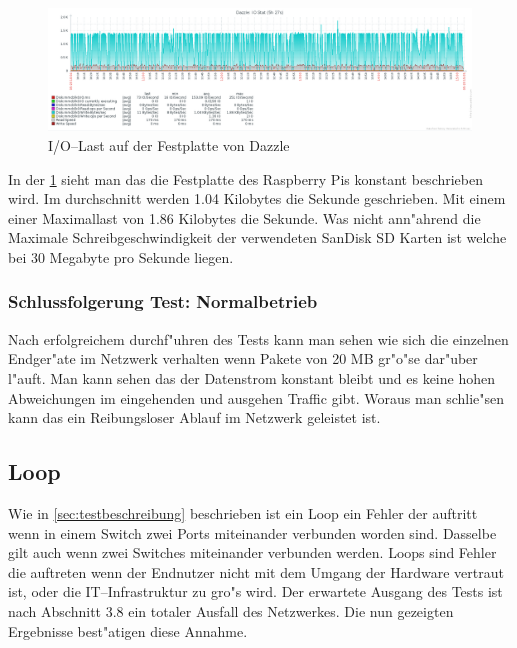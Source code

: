 \begin{figure}[htbp]
\centering
\includegraphics*[width=0.9\linewidth]{Abb/ZabbixDazzle/Standard/IoStatDazzleStandard}

\caption{I/O--Last auf der Festplatte von Dazzle}
\label{fig:IoStatDazzleStandard}
\end{figure}

In der \cref{fig:IoStatDazzleStandard} sieht man das die Festplatte des Raspberry Pis konstant beschrieben wird. Im durchschnitt werden 1.04 Kilobytes %
die Sekunde geschrieben. Mit einem einer Maximallast von 1.86 Kilobytes die Sekunde. Was nicht ann"ahrend die Maximale Schreibgeschwindigkeit der verwendeten %
SanDisk SD Karten ist welche bei 30 Megabyte\autocite{san:sd} pro Sekunde liegen. 

\subsubsection{Schlussfolgerung Test: Normalbetrieb}
\label{subsubsec:schlussfolgerung:normalbetrieb}
Nach erfolgreichem durchf"uhren des Tests kann man sehen wie sich die einzelnen Endger"ate im Netzwerk verhalten wenn Pakete von 20 MB gr"o"se dar"uber l"auft. %
Man kann sehen das der Datenstrom konstant bleibt und es keine hohen Abweichungen im eingehenden und ausgehen Traffic gibt. Woraus man schlie"sen kann das %
ein Reibungsloser Ablauf im Netzwerk geleistet ist. 




\subsection{Loop}
\label{subsec:loop}
Wie in \cref{sec:testbeschreibung} beschrieben ist ein Loop ein Fehler der auftritt wenn in einem Switch zwei Ports miteinander verbunden worden sind. %
Dasselbe gilt auch wenn zwei Switches miteinander verbunden werden. Loops sind Fehler die auftreten wenn der Endnutzer nicht mit dem Umgang der Hardware vertraut ist, %
oder die IT--Infrastruktur zu gro"s wird. %
Der erwartete Ausgang des Tests ist nach Abschnitt 3.8 \autocite{book:schreiner} ein totaler Ausfall des Netzwerkes. Die nun gezeigten Ergebnisse best"atigen diese %
Annahme.  

